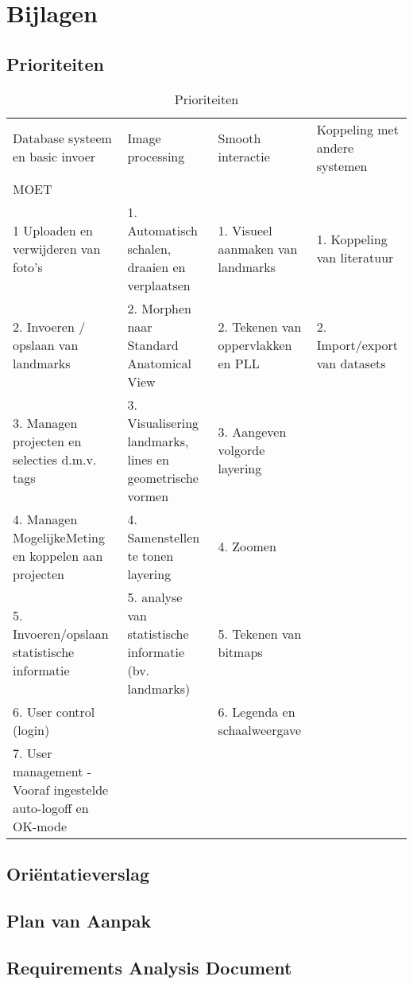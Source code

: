\section{Bijlagen}
\label{Bijlagen}
\subsection{Prioriteiten}
\begin{table*}[htbp]
	\caption{Prioriteiten}
	\label{tab:Prioriteiten}
	\begin{tabular}{llll}
		\large{Database systeem en basic invoer} & \large{Image processing} & \large{Smooth interactie} & \large{Koppeling met andere systemen} \\
		\large{MOET} & & & \\
		1 Uploaden en verwijderen van foto's & 1. Automatisch schalen, draaien en verplaatsen & 1. Visueel aanmaken van landmarks & 1. Koppeling van literatuur \\
		2. Invoeren / opslaan van landmarks & 2. Morphen naar Standard Anatomical View & 2. Tekenen van oppervlakken en PLL & 2. Import/export van datasets \\
		3. Managen projecten en selecties d.m.v. tags & 3. Visualisering landmarks, lines en geometrische vormen & 3. Aangeven volgorde layering & \\
		4. Managen MogelijkeMeting en koppelen aan projecten & 4. Samenstellen te tonen layering & 4. Zoomen & \\
		5. Invoeren/opslaan statistische informatie & 5. analyse van statistische informatie (bv. landmarks) & 5. Tekenen van bitmaps & \\
		6. User control (login) & & 6. Legenda en schaalweergave & \\
		7. User management - Vooraf ingestelde auto-logoff en OK-mode & & & \\
	\end{tabular}
\end{table*}

\subsection{Ori\"{e}ntatieverslag}

\subsection{Plan van Aanpak}

\subsection{Requirements Analysis Document}
